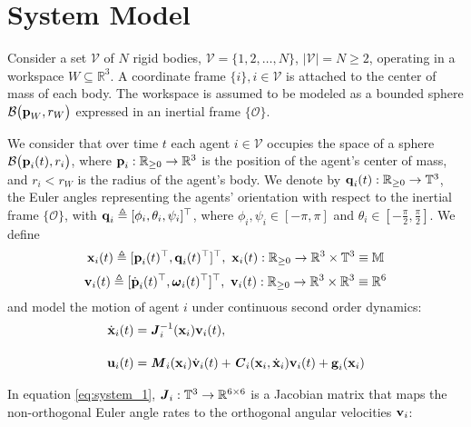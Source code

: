 \section{System Model}

Consider a set $\mathcal{V}$ of $N$ rigid bodies,
$\mathcal{V} = \{ 1,2, \ldots, N\}$, $|\mathcal{V}| = N \geq 2$, operating in
a workspace $W\subseteq \mathbb{R}^3$. A coordinate frame
$\{i\}, i\in\mathcal{V}$ is attached to the center of mass of each body.
The workspace is assumed to be modeled as a
bounded sphere $\mathcal{B}\big(\bm{\mathbf{p}}_W,r_W\big)$ expressed in an inertial frame
$\{\mathcal{O}\}$.

We consider that over time $t$ each agent $i \in \mathcal{V}$ occupies the
space of a sphere $\mathcal{B}\big(\bm{\mathbf{p}}_i(t), r_i\big)$, where
$\bm{\mathbf{p}}_i : \mathbb{R}_{\geq 0} \to \mathbb{R}^3$
is the position of the agent's center of mass, and $r_i < r_W$ is the radius of the
agent's body. We denote by $\bm{\mathbf{q}}_i(t):\mathbb{R}_{\geq 0} \to \mathbb{T}^3$,
the Euler angles representing the agents' orientation with respect to the
inertial frame $\{\mathcal{O}\}$,
with $\bm{\mathbf{q}}_i \triangleq [\phi_i,\theta_i,\psi_i]^{\top}$, where
$\phi_i, \psi_i \in [-\pi, \pi]$ and
$\theta_i \in [-\frac{\pi}{2}, \frac{\pi}{2}]$. We define
$$\bm{\mathbf{x}}_i (t)\triangleq [\bm{\mathbf{p}}_i(t)^{\top},\bm{\mathbf{q}}_i(t)^{\top}]^{\top},\
\bm{\mathbf{x}}_i(t):\mathbb{R}_{\geq 0} \to \mathbb{R}^3\times \mathbb{T}^3 \equiv \mathbb{M}$$
$$\bm{\mathbf{v}}_i(t) \triangleq [\dot{\bm{\mathbf{p}}}_i(t)^{\top}, \bm{\mathbf{\omega}}_i(t)^{\top}]^{\top},\
\bm{\mathbf{v}}_i(t) : \mathbb{R}_{\geq 0} \to \mathbb{R}^3\times \mathbb{R}^3 \equiv \mathbb{R}^6$$
and model the motion of agent $i$ under continuous second order dynamics:
\begin{subequations}
	\begin{align}
    \dot{\bm{\mathbf{x}}}_i(t) &= \bm{\mathit{J}}_i^{-1}(\bm{\mathbf{x}}_i) \bm{\mathbf{v}}_i(t), \label{eq:system_1} \\[2.5ex]
    \bm{\mathbf{u}}_i(t) &= \bm{\mathit{M}}_i(\bm{\mathbf{x}}_i) \dot{\bm{\mathbf{v}}}_i(t) +
      \bm{\mathit{C}}_i(\bm{\mathbf{x}}_i,\dot{\bm{\mathbf{x}}}_i) \bm{\mathbf{v}}_i(t)+\bm{\mathbf{g}}_i(\bm{\mathbf{x}}_i) \label{eq:system_2}
	\end{align}
  \label{eq:system}
\end{subequations}

In equation \eqref{eq:system_1}, $\bm{\mathit{J}}_i:\mathbb{T}^3 \to \mathbb{R}^{6\times6}$ is
a Jacobian matrix that maps the non-orthogonal Euler angle rates to the
orthogonal angular velocities $\bm{\mathbf{v}}_i$:

